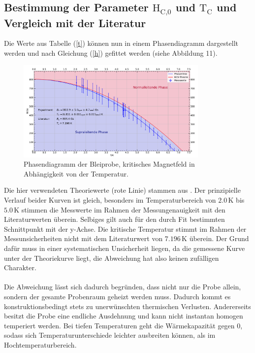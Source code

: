 \documentclass[german,  %
parskip=full,  %
]{scrartcl}
\begin{document}
\subsection{Bestimmung der Parameter $\text{H}_{\text{C,0}}$ und $\text{T}_{\text {C}}$ und Vergleich mit der Literatur}
Die Werte aus Tabelle (\ref{t}) können nun in einem Phasendiagramm dargestellt werden und nach Gleichung (\ref{h}) gefittet werden (siehe Abbildung 11).
\begin{figure}[h!]
\centering
\includegraphics[width=0.835\textwidth]{Phasendiagramm_Blei.pdf}
\caption{Phasendiagramm der Bleiprobe, kritisches Magnetfeld in Abhängigkeit von der Temperatur.}
\end{figure}
\newpage
Die hier verwendeten Theoriewerte (rote Linie) stammen aus \cite{6}. Der prinzipielle Verlauf beider Kurven ist gleich, besonders im Temperaturbereich von $2.0$\,K bis $5.0$\,K stimmen die Messwerte im Rahmen der Messungenauigkeit mit den Literaturwerten überein. Selbiges gilt auch für den durch Fit bestimmten Schnittpunkt mit der y-Achse. Die kritische Temperatur stimmt im Rahmen der Messunsicherheiten nicht mit dem Literaturwert von $7.196$\,K überein. Der Grund dafür muss in einer systematischen Unsicherheit liegen, da die gemessene Kurve unter der Theoriekurve liegt, die Abweichung hat also keinen zufälligen Charakter.
\\\\
Die Abweichung lässt sich dadurch begründen, dass nicht nur die Probe allein, sondern der gesamte Probenraum geheizt werden muss. Dadurch kommt es konstruktionsbedingt stets zu unerwünschten thermischen Verlusten. Andererseits besitzt die Probe eine endliche Ausdehnung und kann nicht instantan homogen temperiert werden. Bei tiefen Temperaturen geht die Wärmekapazität gegen $0$, sodass sich Temperaturunterschiede leichter ausbreiten können, als im Hochtemperaturbereich.
\end{document}

